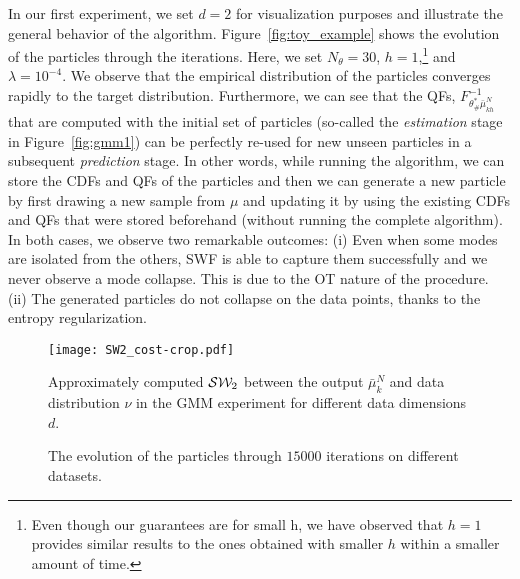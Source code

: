 In our first experiment, we set $d=2$ for visualization purposes and illustrate the general behavior of the algorithm. Figure~\ref{fig:toy_example} shows the evolution of the particles through the iterations. Here, we set $N_\theta=30$, $h=1$,\footnote{Even though our guarantees are for small h, we have observed that $h=1$ provides similar results to the ones obtained with smaller $h$ within a smaller amount of time.} and $\lambda=10^{-4}$.
%
We observe that the empirical distribution of the particles converges rapidly to the target distribution. Furthermore, we can see that the QFs, $F^{-1}_{\theta^*_\#\bar{\mu}_{kh}^{N}}$ that are computed with the initial set of particles (so-called the \textit{estimation} stage in Figure~\ref{fig:gmm1}) can be perfectly re-used for new unseen particles in a subsequent \textit{prediction} stage. In other words, while running the algorithm, we can store the CDFs and QFs of the particles and then we can generate a new particle by first drawing a new sample from $\mu$ and updating it by using the existing CDFs and QFs that were stored beforehand (without running the complete algorithm).
%
%
%
In both cases, we observe two remarkable outcomes: (i) Even when some modes are isolated from the others, SWF is able to capture them successfully and we never observe a mode collapse. This is due to the OT nature of the procedure. (ii) The generated particles do not collapse on the data points, thanks to the entropy regularization.


\begin{figure}
\begin{centering}
\texttt{[image: SW2\_cost-crop.pdf]}
\par\end{centering}
\caption{Approximately computed ${\cal S}{\cal W}_2$ between the output $\bar{\mu}_{k}^{N}$ and data distribution $\nu$ in the GMM experiment for different data dimensions $d$.
\label{fig:toy_sw}}
\end{figure}


\begin{figure*}[t]
\centering
{}
\hfill
{}
\caption{The evolution of the particles through $15000$ iterations on different datasets.}
\end{figure*}

